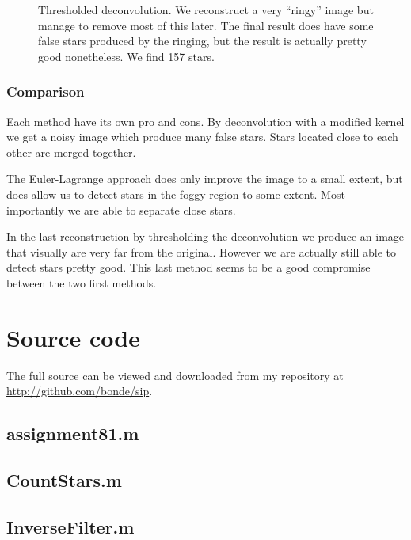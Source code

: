 \documentclass[a4paper, 10pt, final]{article}
\def\repository{\url{http://github.com/bonde/sip}}
\begin{document}
\begin{figure}[!h]
    \caption[]{Thresholded deconvolution. We reconstruct a very
    ``ringy'' image but manage to remove most of this later. The
    final result does have some false stars produced by the ringing, but
    the result is actually pretty good nonetheless. We find 157 stars.}
    \label{countstars_tres}
\end{figure}

\subsubsection*{Comparison}
Each method have its own pro and cons. By deconvolution with a modified
kernel we get a noisy image which produce many false stars. Stars
located close to each other are merged together.

The Euler-Lagrange approach does only improve the image to a small
extent, but does allow us to detect stars in the foggy region to some
extent. Most importantly we are able to separate close stars.

In the last reconstruction by thresholding the deconvolution we produce
an image that visually are very far from the original. However we are
actually still able to detect stars pretty good. This last method seems
to be a good compromise between the two first methods.

\clearpage


%
%

\appendix
\lstset{language=Matlab, basicstyle=\scriptsize,
    showstringspaces=false, numbers=left, stepnumber=1,
    numberstyle=\tiny, frame=none}
\section{Source code}
The full source can be viewed and downloaded from my repository at
\repository{}.

\subsection{assignment81.m}


\subsection{CountStars.m}


\subsection{InverseFilter.m}

\end{document}
